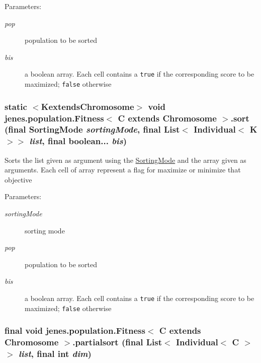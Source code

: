 \begin{Desc}
\item[Parameters:]
\begin{description}
\item[{\em pop}]population to be sorted \item[{\em bis}]a boolean array. Each cell contains a {\tt true} if the corresponding score to be maximized; {\tt false} otherwise \end{description}
\end{Desc}
\hypertarget{classjenes_1_1population_1_1_fitness_3_01_c_01extends_01_chromosome_01_4_351dc03eea62cdfb46b5dfe8e75b34cd}{
\subsubsection[sort]{\setlength{\rightskip}{0pt plus 5cm}static $<$KextendsChromosome$>$ void jenes.population.Fitness$<$ C extends Chromosome $>$.sort (final {\bf SortingMode} {\em sortingMode}, \/  final List$<$ Individual$<$ K $>$$>$ {\em list}, \/  final boolean... {\em bis})}}
\label{classjenes_1_1population_1_1_fitness_3_01_c_01extends_01_chromosome_01_4_351dc03eea62cdfb46b5dfe8e75b34cd}


Sorts the list given as argument using the \hyperlink{}{SortingMode} and the array given as arguments. Each cell of array represent a flag for maximize or minimize that objective

\begin{Desc}
\item[Parameters:]
\begin{description}
\item[{\em sortingMode}]sorting mode \item[{\em pop}]population to be sorted \item[{\em bis}]a boolean array. Each cell contains a {\tt true} if the corresponding score to be maximized; {\tt false} otherwise \end{description}
\end{Desc}
\hypertarget{classjenes_1_1population_1_1_fitness_3_01_c_01extends_01_chromosome_01_4_1f054be21d8801e9485f7ba08ff62db4}{
\subsubsection[partialsort]{\setlength{\rightskip}{0pt plus 5cm}final void jenes.population.Fitness$<$ C extends Chromosome $>$.partialsort (final List$<$ Individual$<$ C $>$$>$ {\em list}, \/  final int {\em dim})}}
\label{classjenes_1_1population_1_1_fitness_3_01_c_01extends_01_chromosome_01_4_1f054be21d8801e9485f7ba08ff62db4}


